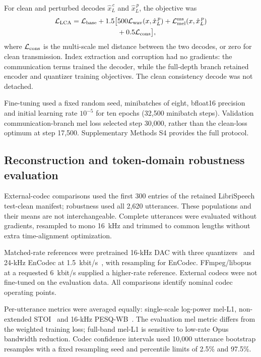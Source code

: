 \documentclass[final,5p,times,twocolumn]{elsarticle}
\begin{document}
For clean and perturbed decodes $\hat{x}_{L}^{\,c}$ and $\hat{x}_{L}^{\,p}$, the objective was
\begin{equation}
\begin{split}
 \mathcal L_{\rm LCA}
 =\mathcal L_{\rm base}
 +1.5\bigl[&
 500\mathcal L_{\rm wav}(x,\hat{x}_{L}^{\,p})
 +\mathcal L_{\rm mel}^{\rm ms}(x,\hat{x}_{L}^{\,p})\\
 &+0.5\mathcal L_{\rm cons}\bigr],
\end{split}
\end{equation}
where $\mathcal L_{\rm cons}$ is the multi-scale mel distance between the two decodes, or zero for clean transmission. Index extraction and corruption had no gradients: the communication terms trained the decoder, while the full-depth branch retained encoder and quantizer training objectives. The clean consistency decode was not detached.

Fine-tuning used a fixed random seed, minibatches of eight, bfloat16 precision and initial learning rate $10^{-5}$ for ten epochs (32,500 minibatch steps). Validation communication-branch mel loss selected step 30,000, rather than the clean-loss optimum at step 17,500. Supplementary Methods S4 provides the full protocol.

\subsection{Reconstruction and token-domain robustness evaluation}
External-codec comparisons used the first 300 entries of the retained LibriSpeech test-clean manifest; robustness used all 2,620 utterances. These populations and their means are not interchangeable. Complete utterances were evaluated without gradients, resampled to mono 16~kHz and trimmed to common lengths without extra time-alignment optimization.

Matched-rate references were pretrained 16-kHz DAC with three quantizers~\cite{dac} and 24-kHz EnCodec at 1.5~kbit/s~\cite{encodec}, with resampling for EnCodec. FFmpeg/libopus at a requested 6~kbit/s supplied a higher-rate reference. External codecs were not fine-tuned on the evaluation data. All comparisons identify nominal codec operating points.

Per-utterance metrics were averaged equally: single-scale log-power mel-L1, non-extended STOI~\cite{stoi} and 16-kHz PESQ-WB~\cite{pesq}. The evaluation mel metric differs from the weighted training loss; full-band mel-L1 is sensitive to low-rate Opus bandwidth reduction. Codec confidence intervals used 10,000 utterance bootstrap resamples with a fixed resampling seed and percentile limits of 2.5\% and 97.5\%.
\end{document}
